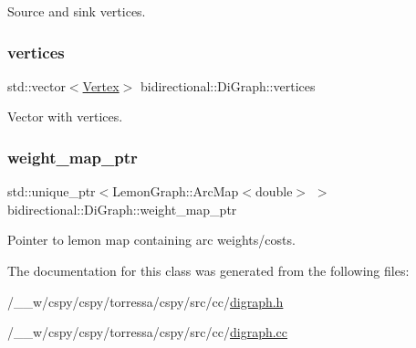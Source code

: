 Source and sink vertices. 

\mbox{\label{classbidirectional_1_1DiGraph_ac1922b68a5f05cc890fcad5acf0b4c35}} 
\subsubsection{\texorpdfstring{vertices}{vertices}}
{\footnotesize\ttfamily std\+::vector$<$\hyperlink{structbidirectional_1_1Vertex}{Vertex}$>$ bidirectional\+::\+Di\+Graph\+::vertices}



Vector with vertices. 

\mbox{\label{classbidirectional_1_1DiGraph_a19b9b7f89e09c77cfeb5ce3a19f2e677}} 
\subsubsection{\texorpdfstring{weight\+\_\+map\+\_\+ptr}{weight\_map\_ptr}}
{\footnotesize\ttfamily std\+::unique\+\_\+ptr$<$Lemon\+Graph\+::\+Arc\+Map$<$double$>$ $>$ bidirectional\+::\+Di\+Graph\+::weight\+\_\+map\+\_\+ptr}



Pointer to lemon map containing arc weights/costs. 



The documentation for this class was generated from the following files\+:\begin{DoxyCompactItemize}
\item 
/\+\_\+\+\_\+w/cspy/cspy/torressa/cspy/src/cc/\hyperlink{digraph_8h}{digraph.\+h}\item 
/\+\_\+\+\_\+w/cspy/cspy/torressa/cspy/src/cc/\hyperlink{digraph_8cc}{digraph.\+cc}\end{DoxyCompactItemize}
